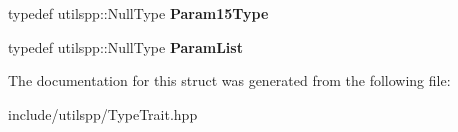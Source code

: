 \begin{DoxyCompactItemize}
\item 
\hypertarget{structutilspp_1_1PointerOnFunction_3_01V_07_5_08_07_08_4_a87658e198f387db87742262ec8f3a7f4}{typedef utilspp\-::\-Null\-Type {\bfseries Param15\-Type}}\label{structutilspp_1_1PointerOnFunction_3_01V_07_5_08_07_08_4_a87658e198f387db87742262ec8f3a7f4}

\item 
\hypertarget{structutilspp_1_1PointerOnFunction_3_01V_07_5_08_07_08_4_a52055a42430ef779b06b1384d486de70}{typedef utilspp\-::\-Null\-Type {\bfseries Param\-List}}\label{structutilspp_1_1PointerOnFunction_3_01V_07_5_08_07_08_4_a52055a42430ef779b06b1384d486de70}

\end{DoxyCompactItemize}


The documentation for this struct was generated from the following file\-:\begin{DoxyCompactItemize}
\item 
include/utilspp/Type\-Trait.\-hpp\end{DoxyCompactItemize}
